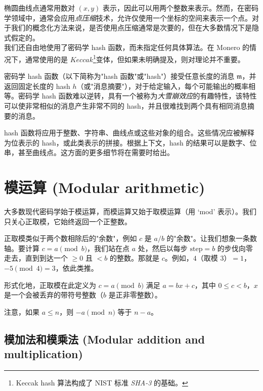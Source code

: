 椭圆曲线点通常用数对 \((x, y)\) 表示，因此可以用两个整数来表示。然而，在密码学领域中，通常会应用{\em 点压缩}技术，允许仅使用一个坐标的空间来表示一个点。对于我们的概念化方法来说，是否使用点压缩通常是次要的，但在大多数情况下是隐式假定的。\\

我们还自由地使用了密码学 hash 函数，而未指定任何具体算法。在 Monero 的情况下，通常使用的是 \(\mathit{Keccak}\)\footnote{\label{kekkak_note}Keccak hash 算法构成了 NIST 标准 {\em SHA-3} \cite{nist-sha3} 的基础。}变体，但如果未明确提及，则对理论并不重要。

密码学 hash 函数（以下简称为"hash 函数"或"hash"）接受任意长度的消息 $\mathfrak{m}$，并返回固定长度的 hash $h$（或"消息摘要"），对于给定输入，每个可能输出的概率相等。密码学 hash 函数难以逆转，具有一个被称为{\em 大雪崩效应}的有趣特性，该特性可以使非常相似的消息产生非常不同的 hash，并且很难找到两个具有相同消息摘要的消息。

hash 函数将应用于整数、字符串、曲线点或这些对象的组合。这些情况应被解释为位表示的 hash，或此类表示的拼接。根据上下文，hash 的结果可以是数字、位串，甚至曲线点。这方面的更多细节将在需要时给出。



\section{模运算 (Modular arithmetic)}
\label{sec:modular-arithmetic}

大多数现代密码学始于模运算，而模运算又始于取模运算（用 `mod' 表示）。我们只关心正取模，它始终返回一个正整数。

正取模类似于两个数相除后的"余数"，例如 $c$ 是 $a/b$ 的"余数"。让我们想象一条数轴。要计算 $c = a \pmod b$，我们站在点 $a$ 处，然后以每步 $\text{step} = b$ 的步伐向零走去，直到到达一个 $\geq{0}$ 且 $<b$ 的整数。那就是 $c$。例如，$4$（取模 3）$= 1$，$-5 \pmod 4 = 3$，依此类推。

形式化地，正取模在此定义为 $c = a \pmod b$ 满足 $a=bx+c$，其中 $0\leq{c}<{b}$，$x$ 是一个会被丢弃的带符号整数（$b$ 是正非零整数）。

注意，如果 $a \leq n$，则 $-a \pmod n$ 等于 $n - a$。


\subsection{模加法和模乘法 (Modular addition and multiplication)}
\label{subsec:modular-addition-multiplication}

